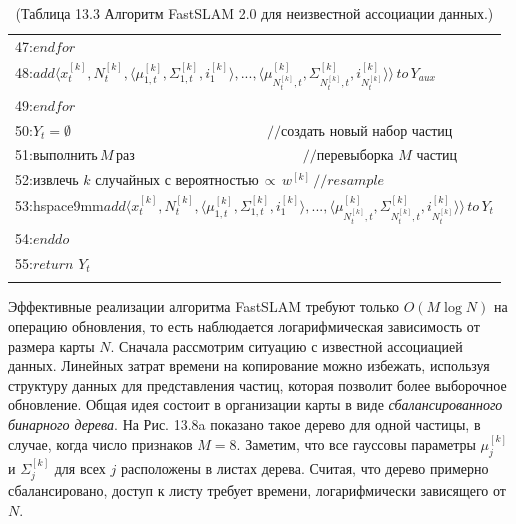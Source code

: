 \documentclass[10pt,a4paper]{article}
\begin{document}
\begin{table}[H]
\begin{center}
\begin{tabular}{|l|}
47:\hspace{9mm}$\textit{endfor}$\\
48:\hspace{9mm}$\textit{add}\langle x_{t}^{[k]},N_{t}^{[k]},\langle\mu_{1,t}^{[k]},\varSigma_{1,t}^{[k]},i_1^{[k]}\rangle,...,\langle\mu_{N_{t}^{[k]},t}^{[k]},\varSigma_{N_{t}^{[k]},t}^{[k]},i_{N_{t}^{[k]}}^{[k]}\rangle\rangle\,\textit{to}\,Y_{aux}$\\
49:\hspace{5mm}$\textit{endfor}$\\
50:\hspace{5mm}$Y_t=\emptyset\qquad\qquad\qquad\qquad\qquad\qquad\qquad//\textit{создать новый набор частиц}$\\
51:\hspace{5mm}$\textit{выполнить}\,M\,\textit{раз}\qquad\qquad\qquad\qquad\qquad\qquad//\textit{перевыборка M частиц}$\\
52:\hspace{9mm}$\textit{извлечь k случайных с вероятностью}\,\propto\,w^{[k]}\,//\textit{resample}$\\
53:hspace{9mm}$\textit{add}\langle x_{t}^{[k]},N_{t}^{[k]},\langle\mu_{1,t}^{[k]},\varSigma_{1,t}^{[k]},i_1^{[k]}\rangle,...,\langle\mu_{N_{t}^{[k]},t}^{[k]},\varSigma_{N_{t}^{[k]},t}^{[k]},i_{N_{t}^{[k]}}^{[k]}\rangle\rangle\,\textit{to}\,Y_t$\\
54:\hspace{5mm}$\textit{enddo}$\\
55:\hspace{5mm}$\textit{return}\,\,Y_t$\\
{}\\
\hline
\end{tabular}
\caption{(Таблица 13.3   Алгоритм FastSLAM 2.0 для неизвестной ассоциации данных.)}
\end{center}
\end{table}


Эффективные реализации алгоритма FastSLAM требуют только $O(M \log N)$ на операцию обновления, то есть наблюдается логарифмическая зависимость от размера карты $N$. Сначала рассмотрим ситуацию с известной ассоциацией данных. Линейных затрат времени на копирование можно избежать, используя структуру данных для представления частиц, которая позволит более выборочное обновление. Общая идея состоит в организации карты в виде \textit{сбалансированного бинарного дерева}. На Рис. 13.8a показано такое дерево для одной частицы, в случае, когда число признаков $M=8$. 
Заметим, что все гауссовы параметры $\mu_j^{[k]}$ и $\varSigma_j^{[k]}$ для всех $j$ расположены в листах дерева.  Считая, что дерево примерно сбалансировано,
доступ к листу требует времени, логарифмически зависящего от $N$.
\end{document}
